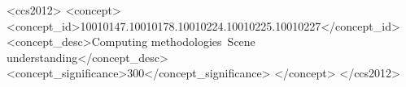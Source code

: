 \documentclass[sigconf]{acmart}
\begin{document}
%
%
\begin{CCSXML}
	<ccs2012>
	<concept>
	<concept_id>10010147.10010178.10010224.10010225.10010227</concept_id>
	<concept_desc>Computing methodologies~Scene understanding</concept_desc>
	<concept_significance>300</concept_significance>
	</concept>
	</ccs2012>
\end{CCSXML}





\maketitle




%



\end{document}
